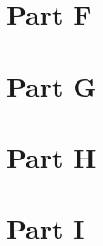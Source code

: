 \documentclass[12pt]{article}
\begin{document}
\section{Part F}


\section{Part G}


\section{Part H}


\section{Part I}
\end{document}

